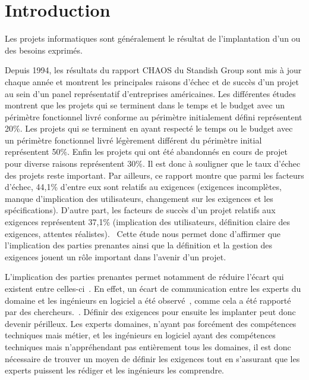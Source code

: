 \chapter*{Introduction}
\label{chap:introduction}

Les projets informatiques sont généralement le résultat de l'implantation d'un ou des besoins exprimés. 

Depuis 1994, les résultats du rapport CHAOS du Standish Group sont mis à jour chaque année et montrent les principales raisons d’échec et de succès d’un projet au sein d’un panel représentatif d’entreprises américaines. Les différentes études montrent que les projets qui se terminent dans le temps et le budget avec un périmètre fonctionnel livré conforme au périmètre initialement défini représentent 20\%. Les projets qui se terminent en ayant respecté le temps ou le budget avec un périmètre fonctionnel livré légèrement différent  du périmètre initial représentent 50\%. Enfin les projets qui ont été abandonnés en cours de projet pour diverse raisons représentent 30\%. Il est donc à souligner que le taux d’échec des projets reste important. Par ailleurs, ce rapport montre que parmi les facteurs d'échec, 44,1\% d'entre eux sont relatifs au exigences (exigences incomplètes, manque d'implication des utilisateurs, changement sur les exigences et les spécifications). D'autre part, les facteurs de succès d'un projet relatifs aux exigences représentent 37,1\% (implication des utilisateurs, définition claire des exigences, attentes réalistes).~\cite{livre1}
Cette étude nous permet donc d’affirmer que l’implication des parties prenantes ainsi que la définition et la gestion des exigences jouent un rôle important dans l’avenir d’un projet.

L'implication des parties prenantes permet notamment de réduire l'écart qui existent entre celles-ci~\cite{article5}. En effet, un écart de communication entre les experts du domaine et les ingénieurs en logiciel a été observé~\cite{article1}, comme cela a été rapporté par des chercheurs.~\cite{article2}. Définir des exigences pour ensuite les implanter peut donc devenir périlleux. Les experts domaines, n'ayant pas forcément des compétences techniques mais métier, et les ingénieurs en logiciel ayant des compétences techniques mais n'appréhendant pas entièrement tous les domaines, il est donc nécessaire de trouver un moyen de définir les exigences tout en s'assurant que les experts puissent les rédiger et les ingénieurs les comprendre. 

